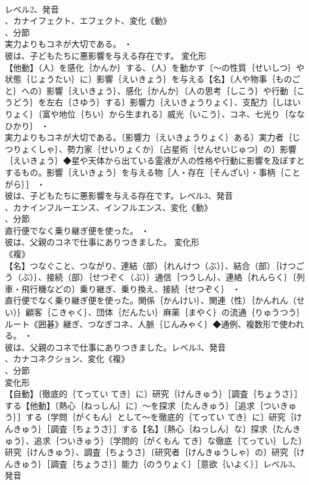 \documentclass[8pt]{extreport}
\begin{document}
\begin{CJK}{UTF8}{min}
\\	レベル2、発音
\\	、カナイフェクト、エフェクト、変化《動》
\\	、分節
\\	実力よりもコネが大切である。 ・
\\	彼は、子どもたちに悪影響を与える存在です。	変化形 
\\	【他動】（人）を感化｛かんか｝する、（人）を動かす〔～の性質｛せいしつ｝や状態｛じょうたい｝に〕影響｛えいきょう｝を与える【名】〔人や物事｛ものごと｝への〕影響｛えいきょう｝、感化｛かんか｝〔人の思考｛しこう｝や行動｛こうどう｝を左右｛さゆう｝する〕影響力｛えいきょうりょく｝、支配力｛しはいりょく｝〔富や地位｛ちい｝から生まれる〕威光｛いこう｝、コネ、七光り｛ななひかり｝ ・
\\	実力よりもコネが大切である。〔影響力｛えいきょうりょく｝ある〕実力者｛じつりょくしゃ｝、勢力家｛せいりょくか｝〔占星術｛せんせいじゅつ｝の〕影響｛えいきょう｝◆星や天体から出ている霊液が人の性格や行動に影響を及ぼすとするもの。影響｛えいきょう｝を与える物［人・存在｛そんざい｝・事柄｛ことがら｝］ ・
\\	彼は、子どもたちに悪影響を与える存在です。レベル3、発音
\\	、カナインフルーエンス、インフルエンス、変化《動》
\\	、分節
\\	直行便でなく乗り継ぎ便を使った。 ・
\\	彼は、父親のコネで仕事にありつきました。	変化形 
\\	《複》
\\	【名】つなぐこと、つながり、連結（部）｛れんけつ（ぶ）｝、結合（部）｛けつごう（ぶ）｝、接続（部）｛せつぞく（ぶ）｝通信｛つうしん｝、連絡｛れんらく｝〔列車・飛行機などの〕乗り継ぎ、乗り換え、接続｛せつぞく｝ ・
\\	直行便でなく乗り継ぎ便を使った。関係｛かんけい｝、関連（性）｛かんれん（せい）｝顧客｛こきゃく｝、団体｛だんたい｝麻薬｛まやく｝の流通｛りゅうつう｝ルート《囲碁》継ぎ、つなぎコネ、人脈｛じんみゃく｝◆通例、複数形で使われる。 ・
\\	彼は、父親のコネで仕事にありつきました。レベル3、発音
\\	、カナコネクション、変化《複》
\\	、分節
\\	変化形 
\\	【自動】〔徹底的｛てってい てき｝に〕研究｛けんきゅう｝［調査｛ちょうさ｝］する【他動】〔熱心｛ねっしん｝に〕～を探求｛たんきゅう｝［追求｛ついきゅう｝］する〔学問｛がくもん｝として～を徹底的｛てってい てき｝に〕研究｛けんきゅう｝［調査｛ちょうさ｝］する【名】〔熱心｛ねっしん｝な〕探求｛たんきゅう｝、追求｛ついきゅう｝〔学問的｛がくもん てき｝な徹底｛てってい｝した〕研究｛けんきゅう｝、調査｛ちょうさ｝〔研究者｛けんきゅうしゃ｝の〕研究｛けんきゅう｝［調査｛ちょうさ｝］能力｛のうりょく｝［意欲｛いよく｝］レベル3、発音

\end{CJK}
\end{document}

